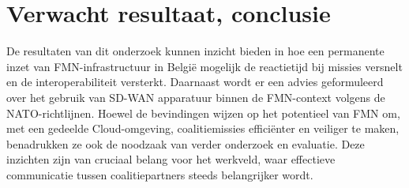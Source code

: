 \section{Verwacht resultaat, conclusie}%
\label{sec:verwachte_resultaten}
De resultaten van dit onderzoek kunnen inzicht bieden in hoe een permanente inzet van FMN-infrastructuur in België mogelijk de reactietijd bij missies versnelt en de interoperabiliteit versterkt. Daarnaast wordt er een advies geformuleerd over het gebruik van SD-WAN apparatuur binnen de FMN-context volgens de NATO-richtlijnen. Hoewel de bevindingen wijzen op het potentieel van FMN om, met een gedeelde Cloud-omgeving, coalitiemissies efficiënter en veiliger te maken, benadrukken ze ook de noodzaak van verder onderzoek en evaluatie. Deze inzichten zijn van cruciaal belang voor het werkveld, waar effectieve communicatie tussen coalitiepartners steeds belangrijker wordt.